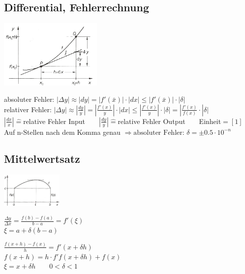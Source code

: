 \subsection{Differential, Fehlerrechnung} 
	\begin{minipage}[c]{7cm} 
		\includegraphics[width=5cm]{./bilder/differential_fehlerrechnung.png} 
	\end{minipage}
	\begin{minipage}[c]{13cm} 
		absoluter Fehler: $\left| \Delta y \right|	\approx \left| dy \right|=\left|f'(\bar{x})\right|\cdot\left| dx \right| \leq	\left| f'(\bar{x}) \right| \cdot \left| \delta \right| $  \\
		relativer Fehler: $|\Delta y| \approx |\frac{dy}{y}| = |\frac{f'(x)}{y}| \cdot |dx| \leq |\frac{f'(x)}{y}| \cdot |\delta| = |\frac{f'(x)}{f(x)} \cdot |\delta|  $ \\
		$|\frac{dx}{x}| \hat{=}$relative Fehler Input$ \qquad |\frac{dy}{y}| \hat{=} $relative Fehler Output$ \qquad $Einheit$ = [1]$\\
		Auf n-Stellen nach dem Komma genau $\Rightarrow \mbox{absoluter Fehler: } \delta = \pm 0.5 \cdot 10^{-n}$ 
	\end{minipage}


\subsection{Mittelwertsatz}
	\begin{minipage}[c]{5cm} 
		\includegraphics[width=3cm]{./bilder/differential_mittelwertsatz.png} 
	\end{minipage}
	\begin{minipage}[c]{7cm} 
		$\frac{\Delta y}{\Delta x}=\frac{f(b) - f(a)}{b - a} = f'(\xi) $ \\
		$\xi = a + \delta(b-a)$
	\end{minipage}
	\begin{minipage}[c]{5cm}
		$\frac{f(x+h) - f(x)}{h} = f'(x+\delta h)$\\
		$f(x+h) = h \cdot f'f(x+\delta h) + f(x)$ \\
		$\xi = x + \delta h \qquad 0<\delta<1$
	\end{minipage}	

